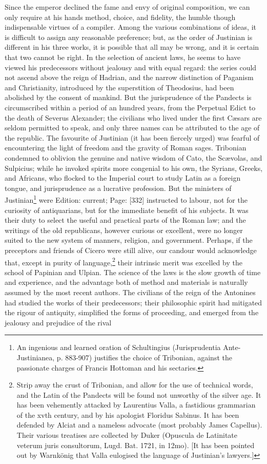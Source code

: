 Since the emperor declined the fame and envy of original composition, we can only require at his hands method, choice, and fidelity, the humble though indispensable virtues of a compiler. Among the various combinations of ideas, it is difficult to assign any reasonable preference; but, as the order of Justinian is different in his three works, it is possible that all may be wrong, and it is certain that two cannot be right. In the selection of ancient laws, he seems to have viewed his predecessors without jealousy and with equal regard: the series could not ascend above the reign of Hadrian, and the narrow distinction of Paganism and Christianity, introduced by the superstition of Theodosius, had been abolished by the consent of mankind. But the jurisprudence of the Pandects is circumscribed within a period of an hundred years, from the Perpetual Edict to the death of Severus Alexander; the civilians who lived under the first Cæsars are seldom permitted to speak, and only three names can be attributed to the age of the republic. The favourite of Justinian (it has been fiercely urged) was fearful of encountering the light of freedom and the gravity of Roman sages. Tribonian condemned to oblivion the genuine and native wisdom of Cato, the Scævolas, and Sulpicius; while he invoked spirits more congenial to his own, the Syrians, Greeks, and Africans, who flocked to the Imperial court to study Latin as a foreign tongue, and jurisprudence as a lucrative profession. But the ministers of Justinian\footnote{An ingenious and learned oration of Schultingius (Jurisprudentia Ante-Justinianea, p. 883-907) justifies the choice of Tribonian, against the passionate charges of Francis Hottoman and his sectaries.} were Edition: current; Page: [332] instructed to labour, not for the curiosity of antiquarians, but for the immediate benefit of his subjects. It was their duty to select the useful and practical parts of the Roman law; and the writings of the old republicans, however curious or excellent, were no longer suited to the new system of manners, religion, and government. Perhaps, if the preceptors and friends of Cicero were still alive, our candour would acknowledge that, except in purity of language,\footnote{Strip away the crust of Tribonian, and allow for the use of technical words, and the Latin of the Pandects will be found not unworthy of the silver age. It has been vehemently attacked by Laurentius Valla, a fastidious grammarian of the xvth century, and by his apologist Floridus Sabinus. It has been defended by Alciat and a nameless advocate (most probably James Capellus). Their various treatises are collected by Duker (Opuscula de Latinitate veterum juris consultorum, Lugd. Bat. 1721, in 12mo). [It has been pointed out by Warnkönig that Valla eulogised the language of Justinian\texthebrew{}’s lawyers.]} their intrinsic merit was excelled by the school of Papinian and Ulpian. The science of the laws is the slow growth of time and experience, and the advantage both of method and materials is naturally assumed by the most recent authors. The civilians of the reign of the Antonines had studied the works of their predecessors; their philosophic spirit had mitigated the rigour of antiquity, simplified the forms of proceeding, and emerged from the jealousy and prejudice of the rival 
